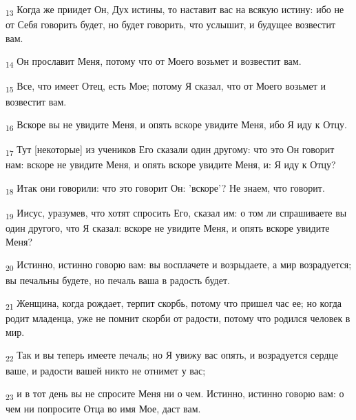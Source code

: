 \begin{tcolorbox}
\textsubscript{13} Когда же приидет Он, Дух истины, то наставит вас на всякую истину: ибо не от Себя говорить будет, но будет говорить, что услышит, и будущее возвестит вам.
\end{tcolorbox}
\begin{tcolorbox}
\textsubscript{14} Он прославит Меня, потому что от Моего возьмет и возвестит вам.
\end{tcolorbox}
\begin{tcolorbox}
\textsubscript{15} Все, что имеет Отец, есть Мое; потому Я сказал, что от Моего возьмет и возвестит вам.
\end{tcolorbox}
\begin{tcolorbox}
\textsubscript{16} Вскоре вы не увидите Меня, и опять вскоре увидите Меня, ибо Я иду к Отцу.
\end{tcolorbox}
\begin{tcolorbox}
\textsubscript{17} Тут [некоторые] из учеников Его сказали один другому: что это Он говорит нам: вскоре не увидите Меня, и опять вскоре увидите Меня, и: Я иду к Отцу?
\end{tcolorbox}
\begin{tcolorbox}
\textsubscript{18} Итак они говорили: что это говорит Он: 'вскоре'? Не знаем, что говорит.
\end{tcolorbox}
\begin{tcolorbox}
\textsubscript{19} Иисус, уразумев, что хотят спросить Его, сказал им: о том ли спрашиваете вы один другого, что Я сказал: вскоре не увидите Меня, и опять вскоре увидите Меня?
\end{tcolorbox}
\begin{tcolorbox}
\textsubscript{20} Истинно, истинно говорю вам: вы восплачете и возрыдаете, а мир возрадуется; вы печальны будете, но печаль ваша в радость будет.
\end{tcolorbox}
\begin{tcolorbox}
\textsubscript{21} Женщина, когда рождает, терпит скорбь, потому что пришел час ее; но когда родит младенца, уже не помнит скорби от радости, потому что родился человек в мир.
\end{tcolorbox}
\begin{tcolorbox}
\textsubscript{22} Так и вы теперь имеете печаль; но Я увижу вас опять, и возрадуется сердце ваше, и радости вашей никто не отнимет у вас;
\end{tcolorbox}
\begin{tcolorbox}
\textsubscript{23} и в тот день вы не спросите Меня ни о чем. Истинно, истинно говорю вам: о чем ни попросите Отца во имя Мое, даст вам.
\end{tcolorbox}
